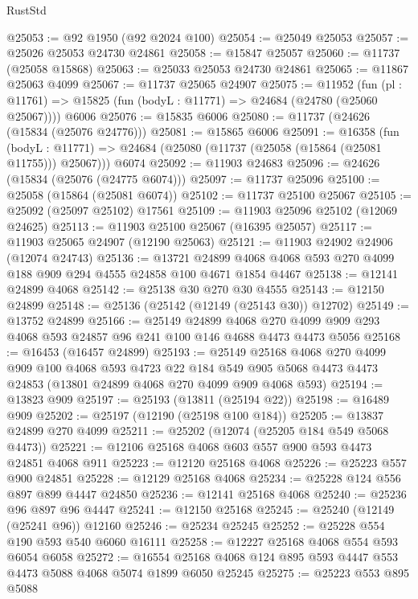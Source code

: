 \begin{lexlean}{RustStd}
\begin{coremodule}
@25053 := @92 @1950 (@92 @2024 @100)
@25054 := @25049 @25053
@25057 := @25026 @25053 @24730 @24861
@25058 := @15847 @25057
@25060 := @11737 (@25058 @15868)
@25063 := @25033 @25053 @24730 @24861
@25065 := @11867 @25063 @4099
@25067 := @11737 @25065 @24907
@25075 := @11952
    (fun (pl : @11761) => @15825 (fun (bodyL : @11771) => @24684 (@24780 (@25060 @25067))))
    @6006
@25076 := @15835 @6006
@25080 := @11737 (@24626 (@15834 (@25076 @24776)))
@25081 := @15865 @6006
@25091 := @16358
    (fun (bodyL : @11771) => @24684 (@25080 (@11737 (@25058 (@15864 (@25081 @11755))) @25067)))
    @6074
@25092 := @11903 @24683
@25096 := @24626 (@15834 (@25076 (@24775 @6074)))
@25097 := @11737 @25096
@25100 := @25058 (@15864 (@25081 @6074))
@25102 := @11737 @25100 @25067
@25105 := @25092 (@25097 @25102) @17561
@25109 := @11903 @25096 @25102 (@12069 @24625)
@25113 := @11903 @25100 @25067 (@16395 @25057)
@25117 := @11903 @25065 @24907 (@12190 @25063)
@25121 := @11903 @24902 @24906 (@12074 @24743)
@25136 := @13721
    @24899
    @4068
    @4068
    @593
    @270
    @4099
    @188
    @909
    @294
    @4555
    @24858
    @100
    @4671
    @1854
    @4467
@25138 := @12141 @24899 @4068
@25142 := @25138 @30 @270 @30 @4555
@25143 := @12150 @24899
@25148 := @25136 (@25142 (@12149 (@25143 @30)) @12702)
@25149 := @13752 @24899
@25166 := @25149
    @24899
    @4068
    @270
    @4099
    @909
    @293
    @4068
    @593
    @24857
    @96
    @241
    @100
    @146
    @4688
    @4473
    @4473
    @5056
@25168 := @16453 (@16457 @24899)
@25193 := @25149
    @25168
    @4068
    @270
    @4099
    @909
    @100
    @4068
    @593
    @4723
    @22
    @184
    @549
    @905
    @5068
    @4473
    @4473
    @24853
    (@13801 @24899 @4068 @270 @4099 @909 @4068 @593)
@25194 := @13823 @909
@25197 := @25193 (@13811 (@25194 @22))
@25198 := @16489 @909
@25202 := @25197 (@12190 (@25198 @100 @184))
@25205 := @13837 @24899 @270 @4099
@25211 := @25202 (@12074 (@25205 @184 @549 @5068 @4473))
@25221 := @12106 @25168 @4068 @603 @557 @900 @593 @4473 @24851 @4068 @911
@25223 := @12120 @25168 @4068
@25226 := @25223 @557 @900 @24851
@25228 := @12129 @25168 @4068
@25234 := @25228 @124 @556 @897 @899 @4447 @24850
@25236 := @12141 @25168 @4068
@25240 := @25236 @96 @897 @96 @4447
@25241 := @12150 @25168
@25245 := @25240 (@12149 (@25241 @96)) @12160
@25246 := @25234 @25245
@25252 := @25228 @554 @190 @593 @540 @6060 @16111
@25258 := @12227 @25168 @4068 @554 @593 @6054 @6058
@25272 := @16554 @25168 @4068 @124 @895 @593 @4447 @553 @4473 @5088 @4068 @5074 @1899 @6050 @25245
@25275 := @25223 @553 @895 @5088

\end{coremodule}
\end{lexlean}
